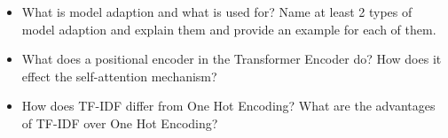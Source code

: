 {\begin{tcolorbox}[skin=widget,
    	coltitle=black,
    	colframe=s-group3!30,
    	colback=s-group3!10,
    	fontupper=\footnotesize,
    	adjusted title=Group 3,
    	boxrule=2mm]
\begin{itemize}
    	\end{itemize}
    \end{tcolorbox}
       	
     \begin{tcolorbox}[skin=widget,
    	coltitle=black,
    	colframe=s-group4!30,
    	colback=s-group4!10,
    	fontupper=\footnotesize,
    	adjusted title=Group 4,
    	boxrule=2mm]
    	\begin{itemize}
    		\setlength\itemsep{-0.2em}
    		\item What is model adaption and what is used for? Name at least 2 types of model adaption and explain them and provide an example for each of them.
    		\item What does a positional encoder in the Transformer Encoder do? How does it effect the self-attention mechanism?
    		\item How does TF-IDF differ from One Hot Encoding? What are the advantages of TF-IDF over One Hot Encoding?

    	\end{itemize}
    \end{tcolorbox}
    
}

